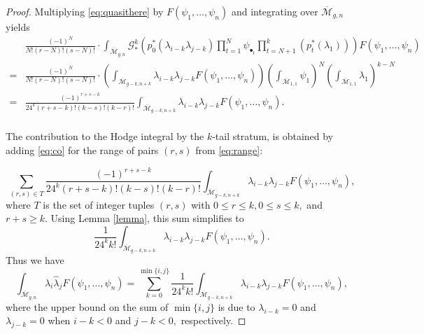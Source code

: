 \documentclass[leqno,12pt]{amsart}
\theoremstyle{remark}
\numberwithin{equation}{section}
\begin{document}
\begin{proof}
Multiplying \eqref{eq:quasithere} by $F(\psi_1, \ldots, \psi_n)$ and integrating  over $\overline{\mathcal{M}}_{g, n}$ yields
\begin{align}\label{eq:co}
 \nonumber   &\frac{(-1)^N}{N!(r-N)!(s-N)!}\cdot\int_{\overline{\mathcal{M}}_{g, n}}\mathcal{G}_*^k\left(p_0^*(\lambda_{i-k}\lambda_{j-k})\prod_{t=1}^{N}\psi_{\bullet_t}\prod_{t=N+1}^k(p_t^\ast(\lambda_1))\right)F(\psi_1, \ldots, \psi_n)\\
 \nonumber   = &\frac{(-1)^N}{N!(r-N)!(s-N)!}\cdot\left(\int_{\overline{\mathcal{M}}_{g-k, n+k}} \lambda_{i-k}\lambda_{j-k}F(\psi_1, \ldots, \psi_n)\right)\left(\int_{\overline{\mathcal{M}}_{1, 1}}\psi_{1}\right)^{N}\left(\int_{\overline{\mathcal{M}}_{1, 1}}\lambda_1\right)^{k-N}\\
 \nonumber   = &\frac{\left(-1\right)^{r+s-k}}{24^k(r+s-k)!(k-s)!(k-r)!}\int_{\overline{\mathcal{M}}_{g-k, n+k}}\lambda_{i-k}\lambda_{j-k} F(\psi_1, \ldots, \psi_n).\\
  & 
\end{align}

The contribution to the Hodge integral by the $k$-tail stratum, is obtained by  adding  \eqref{eq:co} for the range of pairs $(r,s)$ from \eqref{eq:range}:

$$
\sum_{(r, s) \in T} \frac{\left(-1\right)^{r+s-k}}{24^k(r+s-k)!(k-s)!(k-r)!}\int_{\overline{\mathcal{M}}_{g-k, n+k}}\lambda_{i-k}\lambda_{j-k}F(\psi_1, \dots, \psi_n),
$$
where $T$ is the set of integer tuples $(r, s)$ with $0 \leq r \leq k, 0 \leq s \leq k,$ and $r + s \geq k$. Using Lemma \ref{lemma}, this sum simplifies to 
$$
\frac{1}{24^kk!}\int_{\overline{\mathcal{M}}_{g-k, n+k}}\lambda_{i-k}\lambda_{j-k}F(\psi_1, \dots, \psi_n).
$$
Thus we have $$\int_{\overline{\mathcal{M}}_{g, n}} \hat{\lambda}_{i}\hat{\lambda}_{j}F(\psi_1, \dots, \psi_n) = \sum_{k=0}^{\min\{i, j\}}\frac{1}{24^kk!}\int_{\overline{\mathcal{M}}_{g-k, n+k}}\lambda_{i-k}\lambda_{j-k}F(\psi_1, \dots, \psi_n),$$ where the upper bound on the sum of $\min\{i, j\}$ is due to $\lambda_{i-k} = 0$ and $\lambda_{j-k} = 0$ when $i - k < 0$ and $j - k < 0,$ respectively. 
\end{proof}
\end{document}

